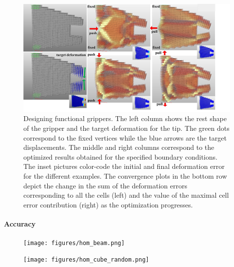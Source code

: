 \begin{figure}[t]
	\centering
	\includegraphics[width=.9\linewidth]{images/gripperVar.png}
	\caption{Designing functional grippers. The left column shows the rest shape of the gripper and the target deformation for the tip.
	The green dots correspond to the fixed vertices while the blue arrows are the target displacements.
	The middle and right columns correspond to the optimized results obtained for the specified boundary conditions.
	The inset pictures color-code the initial and final deformation error for the different examples.
	The convergence plots in the bottom row depict the change in the sum of the deformation errors corresponding to all the cells (left) and the value of the maximal cell error contribution (right) as the optimization progresses.}  
	\label{fig:gripper}
\end{figure}
\paragraph{Accuracy}
\begin{figure}
	\centering
	\texttt{[image: figures/hom\_beam.png]}	
	\caption{
		\label{fig:hom_beam}}
\end{figure}

\begin{figure}[h]
	\centering
	\texttt{[image: figures/hom\_cube\_random.png]}	
	\caption{
		\label{fig:hom_cube_2}}
\end{figure}

